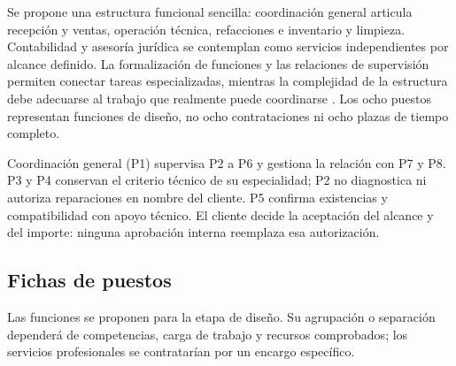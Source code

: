{Se propone una estructura funcional sencilla: coordinación general articula recepción y ventas, operación técnica, refacciones e inventario y limpieza. Contabilidad y asesoría jurídica se contemplan como servicios independientes por alcance definido. La formalización de funciones y las relaciones de supervisión permiten conectar tareas especializadas, mientras la complejidad de la estructura debe adecuarse al trabajo que realmente puede coordinarse . Los ocho puestos representan funciones de diseño, no ocho contrataciones ni ocho plazas de tiempo completo.


Coordinación general (P1) supervisa P2 a P6 y gestiona la relación con P7 y P8. P3 y P4 conservan el criterio técnico de su especialidad; P2 no diagnostica ni autoriza reparaciones en nombre del cliente. P5 confirma existencias y compatibilidad con apoyo técnico. El cliente decide la aceptación del alcance y del importe: ninguna aprobación interna reemplaza esa autorización.


\clearpage\subsection{Fichas de puestos}
Las funciones se proponen para la etapa de diseño. Su agrupación o separación dependerá de competencias, carga de trabajo y recursos comprobados; los servicios profesionales se contratarían por un encargo específico.


}
